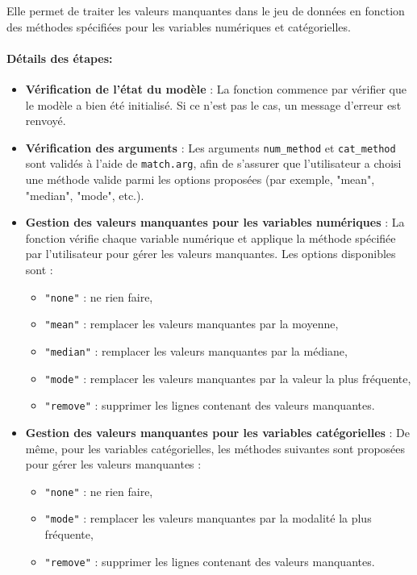 \documentclass{rapport}
\begin{document}
Elle permet de traiter les valeurs manquantes dans le jeu de données en fonction des méthodes spécifiées pour les variables numériques et catégorielles.
\paragraph{Détails des étapes:}
\begin{itemize}
    \item \textbf{Vérification de l'état du modèle} : 
    La fonction commence par vérifier que le modèle a bien été initialisé. Si ce n'est pas le cas, un message d'erreur est renvoyé.
    
    \item \textbf{Vérification des arguments} : 
    Les arguments \texttt{num\_method} et \texttt{cat\_method} sont validés à l'aide de \texttt{match.arg}, afin de s'assurer que l'utilisateur a choisi une méthode valide parmi les options proposées (par exemple, "mean", "median", "mode", etc.).
    
    \item \textbf{Gestion des valeurs manquantes pour les variables numériques} : 
    La fonction vérifie chaque variable numérique et applique la méthode spécifiée par l'utilisateur pour gérer les valeurs manquantes. Les options disponibles sont :
    \begin{itemize}
        \item \texttt{"none"} : ne rien faire,
        \item \texttt{"mean"} : remplacer les valeurs manquantes par la moyenne,
        \item \texttt{"median"} : remplacer les valeurs manquantes par la médiane,
        \item \texttt{"mode"} : remplacer les valeurs manquantes par la valeur la plus fréquente,
        \item \texttt{"remove"} : supprimer les lignes contenant des valeurs manquantes.
    \end{itemize}
    
    \item \textbf{Gestion des valeurs manquantes pour les variables catégorielles} : 
    De même, pour les variables catégorielles, les méthodes suivantes sont proposées pour gérer les valeurs manquantes :
    \begin{itemize}
        \item \texttt{"none"} : ne rien faire,
        \item \texttt{"mode"} : remplacer les valeurs manquantes par la modalité la plus fréquente,
        \item \texttt{"remove"} : supprimer les lignes contenant des valeurs manquantes.
    \end{itemize}
    

\end{itemize}
\end{document}
